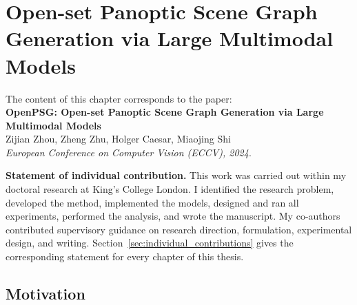 \chapter{Open-set Panoptic Scene Graph Generation via Large Multimodal Models}

\begin{tcolorbox}[
    breakable,
    colback=gray!5,
    colframe=black,
]
The content of this chapter corresponds to the paper: \\
\noindent \textbf{OpenPSG: Open-set Panoptic Scene Graph Generation via Large Multimodal Models} \\
\noindent Zijian Zhou, Zheng Zhu, Holger Caesar, Miaojing Shi \\
\noindent \textit{European Conference on Computer Vision (ECCV), 2024}.

\vspace{0.6em}
\noindent \textbf{Statement of individual contribution.}
This work was carried out within my doctoral research at King's College London. I identified the research problem, developed the method, implemented the models, designed and ran all experiments, performed the analysis, and wrote the manuscript. My co-authors contributed supervisory guidance on research direction, formulation, experimental design, and writing. Section~\ref{sec:individual_contributions} gives the corresponding statement for every chapter of this thesis.
\end{tcolorbox}

\section{Motivation}






